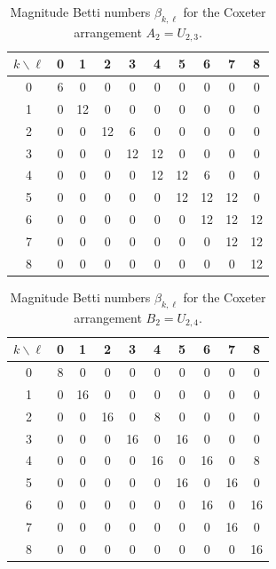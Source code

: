 \documentclass{amsart}
\numberwithin{equation}{section}
\theoremstyle{plain}
\theoremstyle{remark}
\theoremstyle{definition}
\numberwithin{equation}{section}
\begin{document}
    
    
\begin{table}[htpb]
\centering
\begin{tabular}{c|ccccccccc}
\hline
$k \backslash \ell$ & 0 & 1 & 2 & 3 & 4 & 5 & 6 & 7 & 8 \\
\hline
0 & 6 & 0  & 0  & 0   & 0   & 0   & 0   & 0  & 0 \\
1 & 0  & 12 & 0  & 0   & 0   & 0   & 0   & 0  & 0\\
2 & 0  & 0  & 12 & 6  & 0   & 0   & 0   & 0  & 0\\
3 & 0  & 0  & 0  & 12 & 12  & 0  & 0   & 0  & 0\\
4 & 0  & 0  & 0  & 0   & 12 & 12  & 6  & 0  & 0\\
5 & 0  & 0  & 0  & 0   & 0   & 12 & 12  & 12  & 0\\
6 & 0  & 0  & 0  & 0   & 0   & 0   & 12 & 12  & 12\\
7 & 0  & 0  & 0  & 0   & 0   & 0   & 0   & 12 & 12\\
8 & 0  & 0  & 0  & 0   & 0   & 0   & 0   & 0 & 12\\
\hline
\end{tabular}
\vspace{1ex}
\caption{Magnitude Betti numbers $\beta_{k,\ell}$ for the Coxeter arrangement $A_2=U_{2,3}$.}
\label{tab:A2}
\end{table}



\begin{table}[htpb]
\centering
\begin{tabular}{c|ccccccccc}
\hline
$k \backslash \ell$ & 0 & 1 & 2 & 3 & 4 & 5 & 6 & 7 & 8 \\
\hline
0 & 8 & 0  & 0  & 0   & 0   & 0   & 0   & 0  & 0 \\
1 & 0  & 16 & 0  & 0   & 0   & 0   & 0   & 0  & 0\\
2 & 0  & 0  & 16 & 0  & 8   & 0   & 0   & 0  & 0\\
3 & 0  & 0  & 0  & 16 & 0  & 16  & 0   & 0  & 0\\
4 & 0  & 0  & 0  & 0   & 16 & 0  & 16  & 0  & 8\\
5 & 0  & 0  & 0  & 0   & 0   & 16 & 0  & 16  & 0\\
6 & 0  & 0  & 0  & 0   & 0   & 0   & 16 & 0  & 16\\
7 & 0  & 0  & 0  & 0   & 0   & 0   & 0   & 16 & 0\\
8 & 0  & 0  & 0  & 0   & 0   & 0   & 0   & 0 & 16\\
\hline
\end{tabular}
\vspace{1ex}
\caption{Magnitude Betti numbers $\beta_{k,\ell}$ for the Coxeter arrangement $B_2=U_{2,4}$.}
\label{tab:B2}
\end{table}
\end{document}
